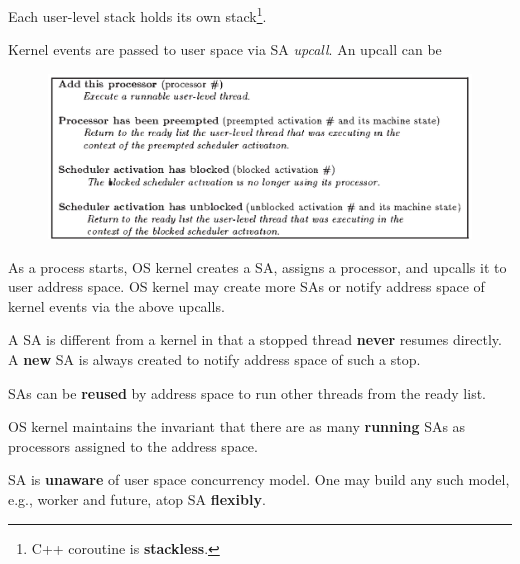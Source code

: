 Each user-level stack holds its own stack\footnote{C++ coroutine is \textbf{stackless}.}.

Kernel events are passed to user space via SA \textit{upcall}. An upcall can be

\begin{figure}[H]
\centering
\includegraphics[width=1\linewidth]{figures/upcall.eps}
\end{figure}

As a process starts, OS kernel creates a SA, assigns a processor, and upcalls it to user address space. OS kernel may create more SAs or notify address space of kernel events via the above upcalls.

\begin{note}
A SA is different from a kernel in that a stopped thread \textbf{never} resumes directly. A \textbf{new} SA is always created to notify address space of such a stop.
\end{note}

SAs can be \textbf{reused} by address space to run other threads from the ready list.

\begin{prop}
OS kernel maintains the invariant that there are as many \textbf{running} SAs as processors assigned to the address space.
\end{prop}

\begin{note}
SA is \textbf{unaware} of user space concurrency model. One may build any such model, e.g., worker and future, atop SA \textbf{flexibly}.
\end{note}

